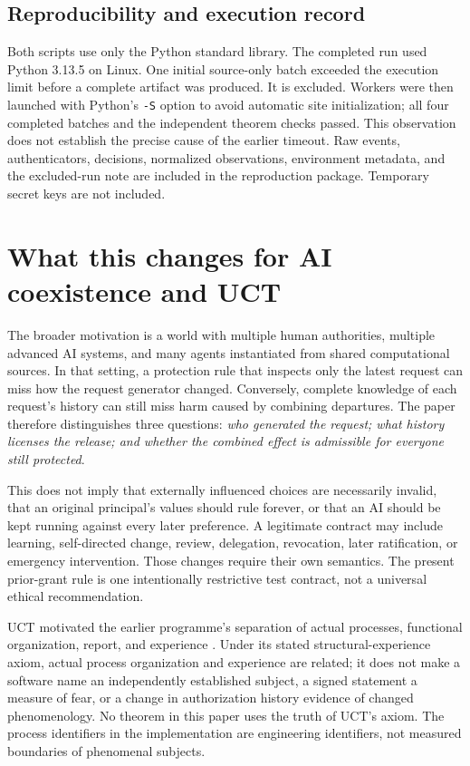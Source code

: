 \subsection{Reproducibility and execution record}
Both scripts use only the Python standard library. The completed run used Python 3.13.5 on Linux. One initial source-only batch exceeded the execution limit before a complete artifact was produced. It is excluded. Workers were then launched with Python's \texttt{-S} option to avoid automatic site initialization; all four completed batches and the independent theorem checks passed. This observation does not establish the precise cause of the earlier timeout. Raw events, authenticators, decisions, normalized observations, environment metadata, and the excluded-run note are included in the reproduction package. Temporary secret keys are not included.

\section{What this changes for AI coexistence and UCT}
\label{sec:uct}
The broader motivation is a world with multiple human authorities, multiple advanced AI systems, and many agents instantiated from shared computational sources. In that setting, a protection rule that inspects only the latest request can miss how the request generator changed. Conversely, complete knowledge of each request's history can still miss harm caused by combining departures. The paper therefore distinguishes three questions: \emph{who generated the request; what history licenses the release; and whether the combined effect is admissible for everyone still protected}.

This does not imply that externally influenced choices are necessarily invalid, that an original principal's values should rule forever, or that an AI should be kept running against every later preference. A legitimate contract may include learning, self-directed change, review, delegation, revocation, later ratification, or emergency intervention. Those changes require their own semantics. The present prior-grant rule is one intentionally restrictive test contract, not a universal ethical recommendation.

UCT motivated the earlier programme's separation of actual processes, functional organization, report, and experience \cite{liuuct,liucheckpoint}. Under its stated structural-experience axiom, actual process organization and experience are related; it does not make a software name an independently established subject, a signed statement a measure of fear, or a change in authorization history evidence of changed phenomenology. No theorem in this paper uses the truth of UCT's axiom. The process identifiers in the implementation are engineering identifiers, not measured boundaries of phenomenal subjects.

